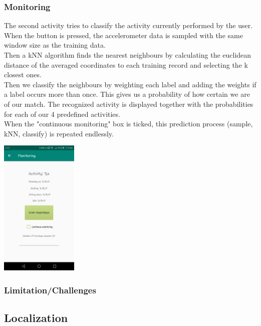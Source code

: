 \documentclass[12pt]{article}
\begin{document}
\subsubsection{Monitoring} \label{sec:monitoring}


The second activity tries to classify the activity currently performed by the user. When the button is pressed, the accelerometer data is sampled with the same window size as the training data. 
\\
Then a kNN algorithm finds the nearest neighbours by calculating the euclidean distance of the averaged coordinates to each training record and selecting the k closest ones. 
\\
Then we classify the neighbours by weighting each label and adding the weights if a label occurs more than once. This gives us a probability of how certain we are of our match. The recognized activity is displayed together with the probabilities for each of our 4 predefined activities.
\\
When the "continuous monitoring" box is ticked, this prediction process (sample, kNN, classify) is repeated endlessly.

\begin{center}
  \includegraphics[width=140px]{images/monitoring.jpeg}
\end{center}

\pagebreak

\subsubsection{Limitation/Challenges}


\subsection{Localization} \label{sec:localization}
\end{document}
